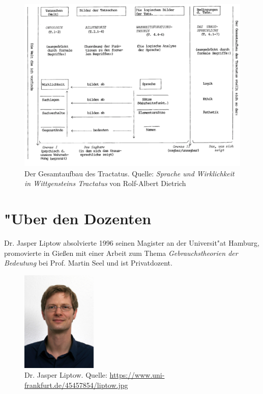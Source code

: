 \documentclass[]{scrartcl}
\begin{document}
\begin{figure}[h]
	\includegraphics[width=1\textwidth]{images/tractatus-structur.png}
	\caption{Der Gesamtaufbau des Tractatus. Quelle: \emph{Sprache und Wirklichkeit in Wittgensteins Tractatus} von Rolf-Albert Dietrich}
	\label{fig:struct}
\end{figure}


\newpage
\section{"Uber den Dozenten}
Dr. Jasper Liptow absolvierte 1996 seinen Magister an der Universit"at Hamburg, promovierte in Gie\ss en mit einer Arbeit zum Thema \emph{Gebrauchstheorien der Bedeutung} bei Prof. Martin Seel und ist Privatdozent.


\begin{figure}[]
	\centering
	\includegraphics[width=0.32\textwidth]{images/liptow.jpg}
	\caption{Dr. Jasper Liptow. Quelle: \url{https://www.uni-frankfurt.de/45457854/liptow.jpg}}
	\label{fig:liptow}
\end{figure}

\end{document}
